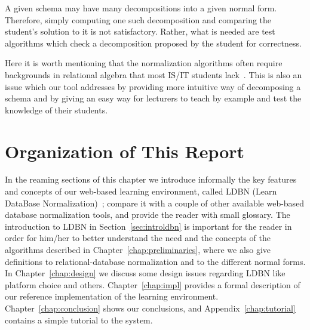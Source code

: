 A given schema may have many decompositions into a given normal form.
Therefore, simply computing one such decomposition and comparing the
student's solution to it is not satisfactory.  Rather, what is needed
are test algorithms which check a decomposition proposed by the student for
correctness.

%

Here it is worth mentioning that the normalization algorithms often require 
backgrounds  in relational algebra that most IS/IT students lack~\cite{p8}. This
is also an issue which our tool addresses by providing more intuitive 
way of decomposing a schema and by giving an easy way for lecturers to
teach by example and test the knowledge of their students. 

\section{Organization of This Report}
\label{sec:organization}
In the reaming sections of this chapter we introduce informally 
the key features and concepts of our web-based learning environment, 
called LDBN (Learn DataBase Normalization)~\cite{wldbn}; 
compare it with a couple of other 
available web-based database normalization tools, and provide the reader with small glossary.  
The introduction to LDBN in Section~\ref{sec:introldbn} is important for the reader
in order for him/her to better understand the need and the concepts of the algorithms described in 
Chapter~\ref{chap:preliminaries}, where we also give definitions to
relational-database normalization and to the different normal forms. 
In Chapter~\ref{chap:design} we discuss some design issues regarding LDBN like 
platform choice and others. Chapter~\ref{chap:impl} provides a formal description
of our reference implementation of the learning environment. 
Chapter~\ref{chap:conclusion} shows our conclusions, and 
Appendix~\ref{chap:tutorial} contains a simple tutorial to the system.

